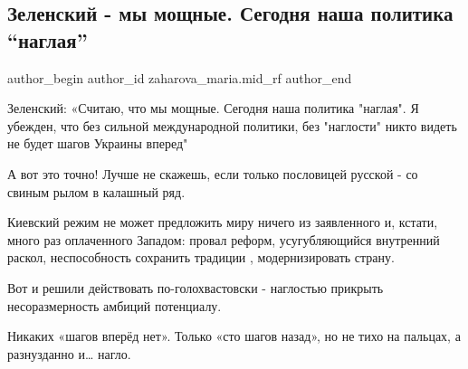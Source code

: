  
 
 
 
 
 
\subsection{Зеленский - мы мощные. Сегодня наша политика \enquote{наглая}}
\label{sec:03_10_2021.fb.zaharova_maria.mid_rf.1.zelenskii_politika_naglost}
 
\ifcmt
 author_begin
   author_id zaharova_maria.mid_rf
 author_end
\fi

Зеленский: «Считаю, что мы мощные. Сегодня наша политика "наглая". Я убежден,
что без сильной международной политики, без "наглости" никто видеть не будет
шагов Украины вперед"

А вот это точно! Лучше не скажешь, если только пословицей русской - со свиным
рылом в калашный ряд.

Киевский режим не может предложить миру ничего из заявленного и, кстати, много
раз оплаченного Западом: провал реформ, усугубляющийся внутренний раскол,
неспособность сохранить традиции , модернизировать страну. 

Вот и решили действовать  по-голохвастовски - наглостью прикрыть
несоразмерность амбиций потенциалу. 

Никаких «шагов вперёд нет». Только «сто  шагов назад», но не тихо на пальцах, а
разнузданно  и… нагло.

